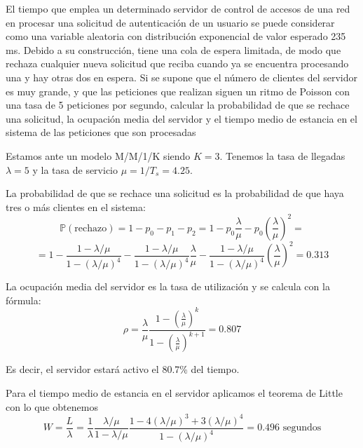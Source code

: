 
\begin{problem}[16]
El tiempo que emplea un determinado servidor de control de accesos de una red en procesar una solicitud de autenticación de un usuario se puede considerar como una variable aleatoria con distribución exponencial de valor esperado 235 ms. Debido a su construcción, tiene una cola de espera limitada, de modo que rechaza cualquier nueva solicitud que reciba cuando ya se encuentra procesando una y hay otras dos en espera. Si se supone que el número de clientes del servidor es muy grande, y que las peticiones que realizan siguen un ritmo de Poisson con una tasa de 5 peticiones por segundo, calcular la probabilidad de que se rechace una solicitud, la ocupación media del servidor y el tiempo medio de estancia en el sistema de las peticiones que son procesadas

\solution

Estamos ante un modelo M/M/1/K siendo $K=3$. Tenemos la tasa de llegadas $λ=5$ y la tasa de servicio $μ=1/T_s=4.25$.

La probabilidad de que se rechace una solicitud es la probabilidad de que haya tres o más clientes en el sistema:
\[\mathbb{P}(\text{rechazo}) = 1- p_0-p_1-p_2 = 1-p_0\frac{λ}{μ}-p_0\left( \frac{λ}{μ}\right)^2 = \]
\[=1-\frac{1-λ/μ}{1-(λ/μ)^{4}}-\frac{1-λ/μ}{1-(λ/μ)^{4}}\frac{λ}{μ}-\frac{1-λ/μ}{1-(λ/μ)^{4}}\left( \frac{λ}{μ}\right)^2 = 0.313\]

La ocupación media del servidor es la tasa de utilización y se calcula con la fórmula:
\[ρ=\frac{λ}{μ}\frac{1-\left( \frac{λ}{μ}\right)^k}{1-\left( \frac{λ}{μ}\right) ^{k+1}}=0.807\]

Es decir, el servidor estará activo el 80.7\% del tiempo.

Para el tiempo medio de estancia en el servidor aplicamos el teorema de Little con lo que obtenemos
\[W = \frac{L}{λ}=\frac{1}{λ}\frac{λ/μ}{1-λ/μ}\frac{1-4(λ/μ)^3+3(λ/μ)^4}{1-(λ/μ)^4}=0.496\text{ segundos}\]

\end{problem}



